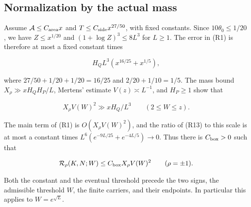\hypertarget{rectangles-normalization-by-the-actual-mass}{%
\subsection{Normalization by the actual
mass}\label{rectangles-normalization-by-the-actual-mass}}

Assume \(\mathcal A\le C_{\rm area}x\) and
\(T\le C_{\rm side}x^{27/50}\), with fixed constants. Since
\(10\theta_0\le1/20\), we have \(Z\le x^{1/20}\) and
\((1+\log Z)^3\le8L^3\) for \(L\ge1\). The error in (R1) is therefore at
most a fixed constant times

\[
H_QL^3(x^{16/25}+x^{1/5}), \tag{R13}
\]

where \(27/50+1/20+1/20=16/25\) and \(2/20+1/10=1/5\). The mass bound
\(X_\rho\gg xH_QH_P/L\), Mertens' estimate \(V(z)\asymp L^{-1}\), and
\(H_P\ge1\) show that

\[
X_\rho V(W)^2\gg xH_Q/L^3\qquad(2\le W\le z).
\]

The main term of (R1) is \(O(X_\rho V(W)^2)\), and the ratio of (R13) to
this scale is at most a constant times
\(L^6(e^{-9L/25}+e^{-4L/5})\to0\). Thus there is \(C_{\rm box}>0\) such
that

\[
\mathcal R_\rho(K,N;W)\le C_{\rm box}X_\rho V(W)^2
\qquad(\rho=\pm1).
\]

Both the constant and the eventual threshold precede the two signs, the
admissible threshold \(W\), the finite carriers, and their endpoints. In
particular this applies to \(W=e^{\sqrt L}\).
